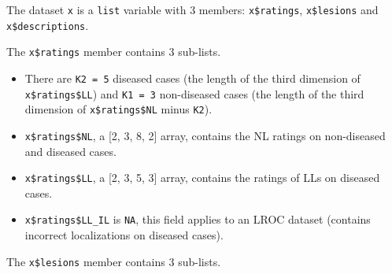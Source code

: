 \documentclass[
]{book}
\newenvironment{Shaded}{\begin{snugshade}}{\end{snugshade}}
\newcommand{\AttributeTok}[1]{\textcolor[rgb]{0.77,0.63,0.00}{#1}}
\newcommand{\CommentTok}[1]{\textcolor[rgb]{0.56,0.35,0.01}{\textit{#1}}}
\newcommand{\DecValTok}[1]{\textcolor[rgb]{0.00,0.00,0.81}{#1}}
\newcommand{\FunctionTok}[1]{\textcolor[rgb]{0.00,0.00,0.00}{#1}}
\newcommand{\NormalTok}[1]{#1}
\newcommand{\SpecialCharTok}[1]{\textcolor[rgb]{0.00,0.00,0.00}{#1}}
\providecommand{\tightlist}{%
  \setlength{\itemsep}{0pt}\setlength{\parskip}{0pt}}
\begin{document}
The dataset \texttt{x} is a \texttt{list} variable with 3 members: \texttt{x\$ratings}, \texttt{x\$lesions} and \texttt{x\$descriptions}.

\begin{Shaded}
\end{Shaded}

The \texttt{x\$ratings} member contains 3 sub-lists.

\begin{Shaded}
\end{Shaded}

\begin{itemize}
\tightlist
\item
  There are \texttt{K2\ =\ 5} diseased cases (the length of the third dimension of \texttt{x\$ratings\$LL}) and \texttt{K1\ =\ 3} non-diseased cases (the length of the third dimension of \texttt{x\$ratings\$NL} minus \texttt{K2}).
\item
  \texttt{x\$ratings\$NL}, a {[}2, 3, 8, 2{]} array, contains the NL ratings on non-diseased and diseased cases.
\item
  \texttt{x\$ratings\$LL}, a {[}2, 3, 5, 3{]} array, contains the ratings of LLs on diseased cases.
\item
  \texttt{x\$ratings\$LL\_IL} is \texttt{NA}, this field applies to an LROC dataset (contains incorrect localizations on diseased cases).
\end{itemize}

The \texttt{x\$lesions} member contains 3 sub-lists.

\begin{Shaded}
\end{Shaded}
\end{document}
